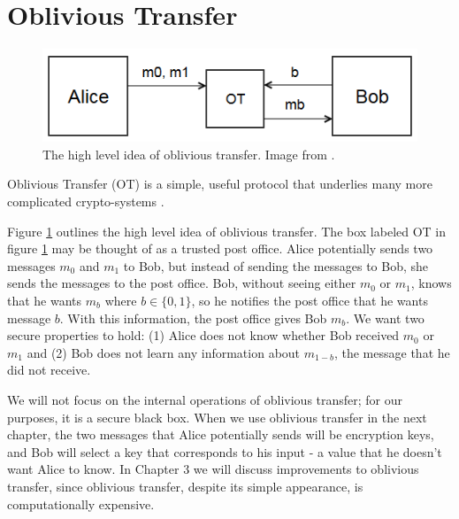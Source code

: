 \section{Oblivious Transfer}

\begin{figure}[h]
    \center
    \includegraphics[scale=.8]{images/ot}
    \caption[Overview of oblivious transfer]{The high level idea of oblivious transfer. Image from \cite{alexirpan}.}
    \label{fig:basic-ot}
\end{figure}
Oblivious Transfer (OT) is a simple, useful protocol that underlies many more complicated crypto-systems \cite{EGL82, Rab05}.

Figure \ref{fig:basic-ot} outlines the high level idea of oblivious transfer.
The box labeled OT in figure \ref{fig:basic-ot} may be thought of as a trusted post office.
Alice potentially sends two messages $m_0$ and $m_1$ to Bob, but instead of sending the messages to Bob, she sends the messages to the post office.
Bob, without seeing either $m_0$ or $m_1$, knows that he wants $m_b$ where $b \in \{0,1\}$, so he notifies the post office that he wants message $b$.
With this information, the post office gives Bob $m_b$.
We want two secure properties to hold: (1) Alice does not know whether Bob received $m_0$ or $m_1$ and (2) Bob does not learn any information about $m_{1-b}$, the message that he did not receive.

We will not focus on the internal operations of oblivious transfer; for our purposes, it is a secure black box.
When we use oblivious transfer in the next chapter, the two messages that Alice potentially sends will be encryption keys, and Bob will select a key that corresponds to his input - a value that he doesn't want Alice to know.
In Chapter 3 we will discuss improvements to oblivious transfer, since oblivious transfer, despite its simple appearance, is computationally expensive.
